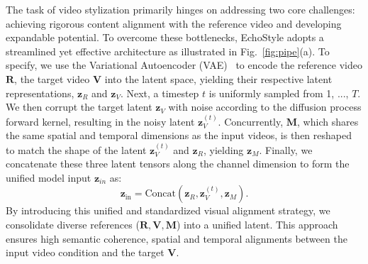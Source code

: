 \documentclass[runningheads]{llncs}
\begin{document}
The task of video stylization primarily hinges on addressing two core challenges: achieving rigorous content alignment with the reference video and developing expandable potential. To overcome these bottlenecks, EchoStyle adopts a streamlined yet effective architecture as illustrated in Fig.~\ref{fig:pipe}(a). To specify, we use the Variational Autoencoder (VAE)~\cite{VAE} to encode the reference video $\mathbf{R}$, the target video $\mathbf{V}$ into the latent space, yielding their respective latent representations, $\mathbf{z}_R$ and $\mathbf{z}_V$.
Next, a timestep $t$ is uniformly sampled from {1, ..., $T$}. We then corrupt the target latent $\mathbf{z}_V$ with noise according to the diffusion process forward kernel, resulting in the noisy latent $\mathbf{z}_V^{(t)}$.
Concurrently, $\mathbf{M}$, which shares the same spatial and temporal dimensions as the input videos, is then reshaped to match the shape of the latent $\mathbf{z}_V^{(t)}$ and $\mathbf{z}_R$, yielding $\mathbf{z}_M$. Finally, we concatenate these three latent tensors along the channel dimension to form the unified model input $\mathbf{z}_{in}$ as:
\begin{equation}
    \mathbf{z}_{\text{in}} = \text{Concat}(\mathbf{z}_R, \mathbf{z}_V^{(t)}, \mathbf{z}_M).
    \label{equ:concat}
\end{equation}
By introducing this unified and standardized visual alignment strategy, we consolidate diverse references ($\mathbf{R},\mathbf{V},\mathbf{M}$) into a unified latent. This approach ensures high semantic coherence, spatial and temporal alignments between the input video condition and the target $\mathbf{V}$.
\end{document}
